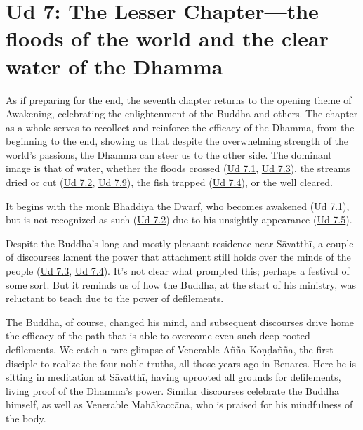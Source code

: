 \documentclass[12pt,openany]{book}%
\begin{document}
\section*{Ud 7: The Lesser Chapter—the floods of the world and the clear water of the Dhamma}

As if preparing for the end, the seventh chapter returns to the opening theme of Awakening, celebrating the enlightenment of the Buddha and others. The chapter as a whole serves to recollect and reinforce the efficacy of the Dhamma, from the beginning to the end, showing us that despite the overwhelming strength of the world’s passions, the Dhamma can steer us to the other side. The dominant image is that of water, whether the floods crossed (\href{https://suttacentral.net/ud7.1/en/sujato}{Ud 7.1}, \href{https://suttacentral.net/ud7.3/en/sujato}{Ud 7.3}), the streams dried or cut (\href{https://suttacentral.net/ud7.2/en/sujato}{Ud 7.2}, \href{https://suttacentral.net/ud7.9/en/sujato}{Ud 7.9}), the fish trapped (\href{https://suttacentral.net/ud7.4/en/sujato}{Ud 7.4}), or the well cleared.

It begins with the monk Bhaddiya the Dwarf, who becomes awakened (\href{https://suttacentral.net/ud7.1/en/sujato}{Ud 7.1}), but is not recognized as such (\href{https://suttacentral.net/ud7.2/en/sujato}{Ud 7.2}) due to his unsightly appearance (\href{https://suttacentral.net/ud7.5/en/sujato}{Ud 7.5}). 

Despite the Buddha’s long and mostly pleasant residence near \textsanskrit{Sāvatthī}, a couple of discourses lament the power that attachment still holds over the minds of the people (\href{https://suttacentral.net/ud7.3/en/sujato}{Ud 7.3}, \href{https://suttacentral.net/ud7.4/en/sujato}{Ud 7.4}). It’s not clear what prompted this; perhaps a festival of some sort. But it reminds us of how the Buddha, at the start of his ministry, was reluctant to teach due to the power of defilements.

The Buddha, of course, changed his mind, and subsequent discourses drive home the efficacy of the path that is able to overcome even such deep-rooted defilements. We catch a rare glimpse of Venerable \textsanskrit{Añña} \textsanskrit{Koṇḍañña}, the first disciple to realize the four noble truths, all those years ago in Benares. Here he is sitting in meditation at \textsanskrit{Sāvatthī}, having uprooted all grounds for defilements, living proof of the Dhamma’s power. Similar discourses celebrate the Buddha himself, as well as Venerable \textsanskrit{Mahākaccāna}, who is praised for his mindfulness of the body.
\end{document}

